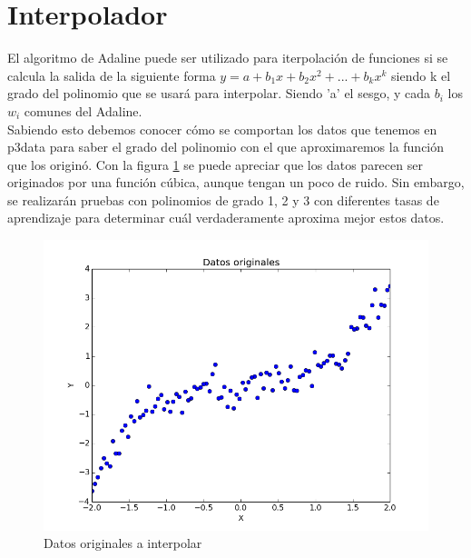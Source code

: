 \documentclass[a4paper]{article}
\begin{document}
\section{Interpolador}
	El algoritmo de Adaline puede ser utilizado para iterpolación de funciones si se calcula la salida de la siguiente forma $y = a + b_{1}x + b_{2}x^{2} + ... + b_{k}x^{k}$ siendo k el grado del polinomio que se usará para interpolar. Siendo 'a' el sesgo, y cada $b_{i}$ los $w_{i}$ comunes del Adaline.\\
	
	Sabiendo esto debemos conocer cómo se comportan los datos que tenemos en p3data para saber el grado del polinomio con el que aproximaremos la función que los originó. Con la figura \ref{fig:interpolador} se puede apreciar que los datos parecen ser originados por una función cúbica, aunque tengan un poco de ruido. Sin embargo, se realizarán pruebas con polinomios de grado 1, 2 y 3 con diferentes tasas de aprendizaje para determinar cuál verdaderamente aproxima mejor estos datos.
	
	\begin{figure}[H]
	\centering
	\includegraphics[scale=0.3]{interpolado.png}
	\caption{Datos originales a interpolar}
	\label{fig:interpolador}
	\end{figure}
	
\end{document}
